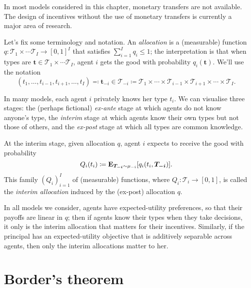 In most models considered in this chapter, monetary transfers are not available.
The design of incentives without the use of monetary transfers is currently a major area of research.


Let's fix some terminology and notation.
An \emph{allocation} is a (measurable) function $q : \mathcal{T}_1 \times \cdots \mathcal{T}_I \to [0,1]^I$ that satisfies $\sum_{i=1}^I q_i \leq 1$;
the interpretation is that when types are $\boldsymbol{t} \in \mathcal{T}_1 \times \cdots \mathcal{T}_I$, agent $i$ gets the good with probability $q_i(\boldsymbol{t})$.
We'll use the notation
%
\begin{equation*}
	(t_1,\dots,t_{i-1},t_{i+1},\dots,t_I)
	\eqqcolon \boldsymbol{t}_{-i}
	\in \mathcal{T}_{-i}
	\coloneqq \mathcal{T}_1 \times \cdots \times \mathcal{T}_{i-1}
	\times \mathcal{T}_{i+1} \times \cdots \times \mathcal{T}_I .
\end{equation*}

In many models, each agent $i$ privately knows her type $t_i$.
We can visualise three stages:
the (perhaps fictional) \emph{ex-ante} stage at which agents do not know anyone's type,
the \emph{interim} stage at which agents know their own types but not those of others,
and the \emph{ex-post} stage at which all types are common knowledge.

At the interim stage, given allocation $q$, agent $i$ expects to receive the good with probability
%
\begin{equation*}
	Q_i(t_i)
	\coloneqq \E_{\boldsymbol{T_{-i}} \sim \mu_{-i}}\left[ q_i(t_i,\boldsymbol{T_{-i}}) \right] .
\end{equation*}
%
This family $(Q_i)_{i=1}^I$ of (measurable) functions, where $Q_i : \mathcal{T}_i \to [0,1]$,
is called the \emph{interim allocation} induced by the (ex-post) allocation $q$.

In all models we consider, agents have expected-utility preferences, so that their payoffs are linear in $q$; then if agents know their types when they take decisions, it only is the interim allocation that matters for their incentives.
Similarly, if the principal has an expected-utility objective that is additively separable across agents, then only the interim allocations matter to her.



\section{Border's theorem}
\label{sec:ch2:border}

